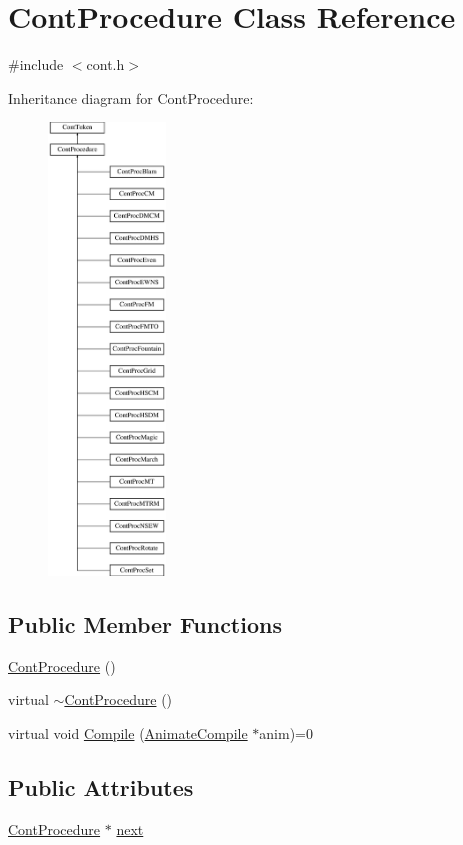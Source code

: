 \hypertarget{a00067}{\section{Cont\-Procedure Class Reference}
\label{a00067}
}


{\ttfamily \#include $<$cont.\-h$>$}

Inheritance diagram for Cont\-Procedure\-:\begin{figure}[H]
\begin{center}
\leavevmode
\includegraphics[height=12.000000cm]{a00067}
\end{center}
\end{figure}
\subsection*{Public Member Functions}
\begin{DoxyCompactItemize}
\item 
\hyperlink{a00067_a817bd84c2eac5073e90fed4000a190e0}{Cont\-Procedure} ()
\item 
virtual \hyperlink{a00067_a4d9a1ee6f37ad1885568e1a4d5ae2305}{$\sim$\-Cont\-Procedure} ()
\item 
virtual void \hyperlink{a00067_a7f7adefe250a00b3778669ef649f03ac}{Compile} (\hyperlink{a00007}{Animate\-Compile} $\ast$anim)=0
\end{DoxyCompactItemize}
\subsection*{Public Attributes}
\begin{DoxyCompactItemize}
\item 
\hyperlink{a00067}{Cont\-Procedure} $\ast$ \hyperlink{a00067_aac5b4a7edc2e4778ef7bb8dfed6ede8e}{next}
\end{DoxyCompactItemize}


